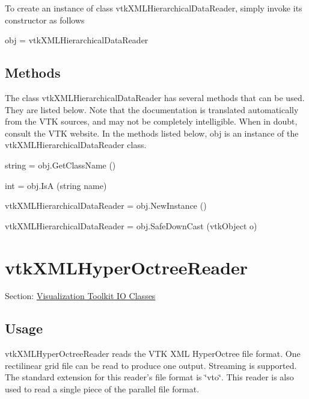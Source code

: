 To create an instance of class vtk\-X\-M\-L\-Hierarchical\-Data\-Reader, simply invoke its constructor as follows \begin{DoxyVerb}  obj = vtkXMLHierarchicalDataReader
\end{DoxyVerb}
 \hypertarget{vtkwidgets_vtkxyplotwidget_Methods}{}\subsection{Methods}\label{vtkwidgets_vtkxyplotwidget_Methods}
The class vtk\-X\-M\-L\-Hierarchical\-Data\-Reader has several methods that can be used. They are listed below. Note that the documentation is translated automatically from the V\-T\-K sources, and may not be completely intelligible. When in doubt, consult the V\-T\-K website. In the methods listed below, {\ttfamily obj} is an instance of the vtk\-X\-M\-L\-Hierarchical\-Data\-Reader class. 
\begin{DoxyItemize}
\item {\ttfamily string = obj.\-Get\-Class\-Name ()}  
\item {\ttfamily int = obj.\-Is\-A (string name)}  
\item {\ttfamily vtk\-X\-M\-L\-Hierarchical\-Data\-Reader = obj.\-New\-Instance ()}  
\item {\ttfamily vtk\-X\-M\-L\-Hierarchical\-Data\-Reader = obj.\-Safe\-Down\-Cast (vtk\-Object o)}  
\end{DoxyItemize}\hypertarget{vtkio_vtkxmlhyperoctreereader}{}\section{vtk\-X\-M\-L\-Hyper\-Octree\-Reader}\label{vtkio_vtkxmlhyperoctreereader}
Section\-: \hyperlink{sec_vtkio}{Visualization Toolkit I\-O Classes} \hypertarget{vtkwidgets_vtkxyplotwidget_Usage}{}\subsection{Usage}\label{vtkwidgets_vtkxyplotwidget_Usage}
vtk\-X\-M\-L\-Hyper\-Octree\-Reader reads the V\-T\-K X\-M\-L Hyper\-Octree file format. One rectilinear grid file can be read to produce one output. Streaming is supported. The standard extension for this reader's file format is \char`\"{}vto\char`\"{}. This reader is also used to read a single piece of the parallel file format.

